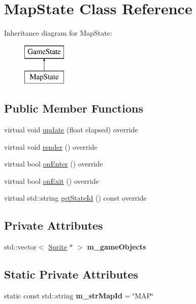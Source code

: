 \hypertarget{class_map_state}{}\section{Map\+State Class Reference}
\label{class_map_state}
Inheritance diagram for Map\+State\+:\begin{figure}[H]
\begin{center}
\leavevmode
\includegraphics[height=2.000000cm]{class_map_state}
\end{center}
\end{figure}
\subsection*{Public Member Functions}
\begin{DoxyCompactItemize}
\item 
virtual void \mbox{\hyperlink{class_map_state_afeafeea186395c2d4c5ce5c4936b9855}{update}} (float elapsed) override
\item 
virtual void \mbox{\hyperlink{class_map_state_a6e06116bc2372a7e0939bb129ea66a3e}{render}} () override
\item 
virtual bool \mbox{\hyperlink{class_map_state_aa0a860d4f4c09fa6f7da28a243b1fc37}{on\+Enter}} () override
\item 
virtual bool \mbox{\hyperlink{class_map_state_ab2daa5de8a62640f5373ce69315aac93}{on\+Exit}} () override
\item 
virtual std\+::string \mbox{\hyperlink{class_map_state_a0434e96d8a597fe7f5cbc6205e4b8f85}{get\+State\+Id}} () const override
\end{DoxyCompactItemize}
\subsection*{Private Attributes}
\begin{DoxyCompactItemize}
\item 
\mbox{\label{class_map_state_ae5607428122582e17233beb896a8aab8}} 
std\+::vector$<$ \mbox{\hyperlink{class_sprite}{Sprite}} $\ast$ $>$ {\bfseries m\+\_\+game\+Objects}
\end{DoxyCompactItemize}
\subsection*{Static Private Attributes}
\begin{DoxyCompactItemize}
\item 
\mbox{\label{class_map_state_aece6fc7e969388a98afbb1ecf243e95f}} 
static const std\+::string {\bfseries m\+\_\+str\+Map\+Id} = \char`\"{}M\+AP\char`\"{}
\end{DoxyCompactItemize}


